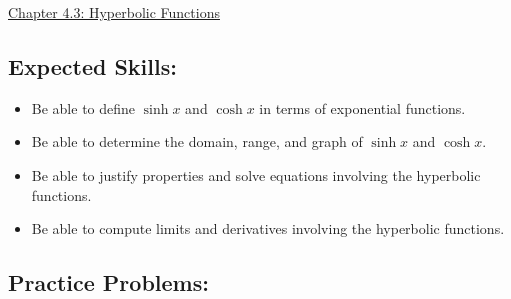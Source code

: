\documentclass[12pt]{article}
\begin{document}
\begin{center}
\underline{\LARGE{Chapter 4.3: Hyperbolic Functions}}
\end{center}

\subsection*{Expected Skills:}

\begin{itemize}

\item Be able to define $\sinh{x}$ and $\cosh{x}$ in terms of exponential functions.

\item Be able to determine the domain, range, and graph of $\sinh{x}$ and $\cosh{x}$.

\item Be able to justify properties and solve equations involving the hyperbolic functions.

\item Be able to compute limits and derivatives involving the hyperbolic functions.

\end{itemize}

\subsection*{Practice Problems: }
\end{document}
